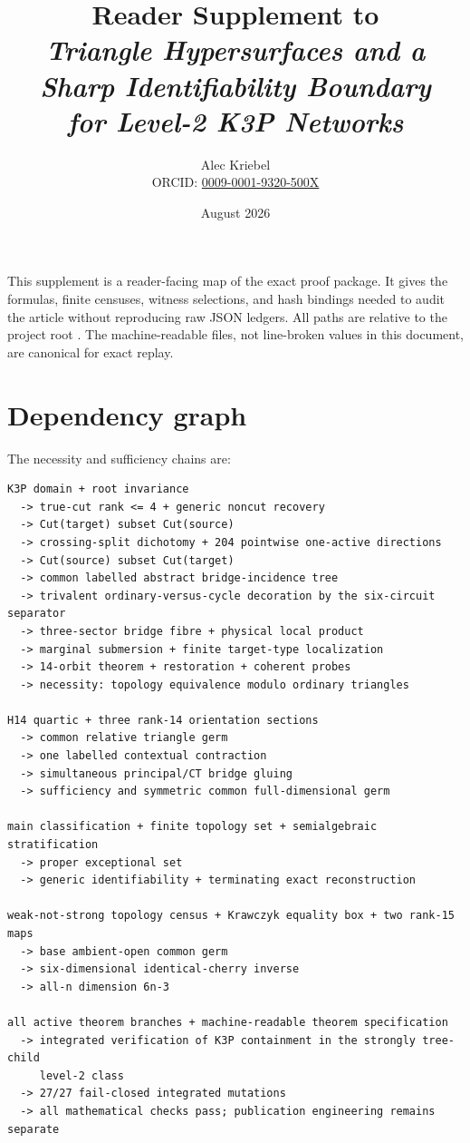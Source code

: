 \documentclass[10pt]{article}
\title{Reader Supplement to\\
\emph{Triangle Hypersurfaces and a Sharp Identifiability Boundary\\
for Level-2 K3P Networks}}
\author{Alec Kriebel\\
\small ORCID: \href{https://orcid.org/0009-0001-9320-500X}
{0009-0001-9320-500X}}
\date{August 2026}
\begin{document}
\maketitle

This supplement is a reader-facing map of the exact proof package.  It gives
the formulas, finite censuses, witness selections, and hash bindings needed
to audit the article without reproducing raw JSON ledgers.  All paths are
relative to the project root
.  The machine-readable files, not
line-broken values in this document, are canonical for exact replay.

\section{Dependency graph}

The necessity and sufficiency chains are:

\begin{verbatim}
K3P domain + root invariance
  -> true-cut rank <= 4 + generic noncut recovery
  -> Cut(target) subset Cut(source)
  -> crossing-split dichotomy + 204 pointwise one-active directions
  -> Cut(source) subset Cut(target)
  -> common labelled abstract bridge-incidence tree
  -> trivalent ordinary-versus-cycle decoration by the six-circuit separator
  -> three-sector bridge fibre + physical local product
  -> marginal submersion + finite target-type localization
  -> 14-orbit theorem + restoration + coherent probes
  -> necessity: topology equivalence modulo ordinary triangles

H14 quartic + three rank-14 orientation sections
  -> common relative triangle germ
  -> one labelled contextual contraction
  -> simultaneous principal/CT bridge gluing
  -> sufficiency and symmetric common full-dimensional germ

main classification + finite topology set + semialgebraic stratification
  -> proper exceptional set
  -> generic identifiability + terminating exact reconstruction

weak-not-strong topology census + Krawczyk equality box + two rank-15 maps
  -> base ambient-open common germ
  -> six-dimensional identical-cherry inverse
  -> all-n dimension 6n-3

all active theorem branches + machine-readable theorem specification
  -> integrated verification of K3P containment in the strongly tree-child
     level-2 class
  -> 27/27 fail-closed integrated mutations
  -> all mathematical checks pass; publication engineering remains separate
\end{verbatim}
\end{document}
